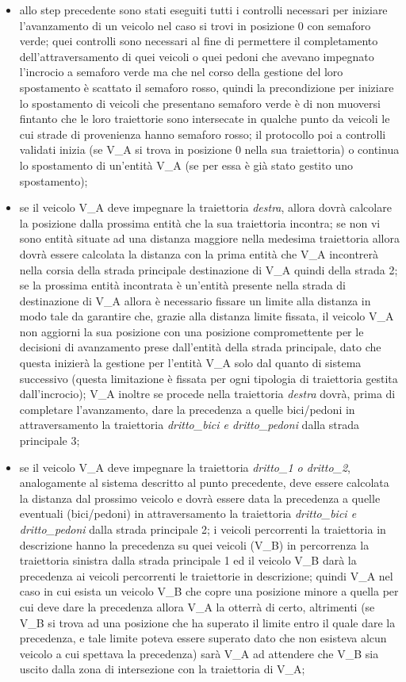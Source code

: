 \begin{enumerate}
\begin{enumerate}
\begin{itemize}
\item allo step precedente sono stati eseguiti tutti i controlli necessari per iniziare l'avanzamento di un veicolo nel caso si trovi in posizione 0 con semaforo verde; quei controlli sono necessari al fine di permettere il completamento dell'attraversamento di quei veicoli o quei pedoni che avevano impegnato l'incrocio a semaforo verde ma che nel corso della gestione del loro spostamento è scattato il semaforo rosso, quindi la precondizione per iniziare lo spostamento di veicoli che presentano semaforo verde è di non muoversi fintanto che le loro traiettorie sono intersecate in qualche punto da veicoli le cui strade di provenienza hanno semaforo rosso; il protocollo poi a controlli validati inizia (se V\_A si trova in posizione 0 nella sua traiettoria) o continua lo spostamento di un'entità V\_A (se per essa è già stato gestito uno spostamento);
\item se il veicolo V\_A deve impegnare la traiettoria \textit{destra}, allora dovrà calcolare la posizione dalla prossima entità che la sua traiettoria incontra; se non vi sono entità situate ad una distanza maggiore nella medesima traiettoria allora dovrà essere calcolata la distanza con la prima entità che V\_A incontrerà nella corsia della strada principale destinazione di V\_A quindi della strada 2; se la prossima entità incontrata è un'entità presente nella strada di destinazione di V\_A allora è necessario fissare un limite alla distanza in modo tale da garantire che, grazie alla distanza limite fissata, il veicolo V\_A non aggiorni la sua posizione con una posizione compromettente per le decisioni di avanzamento prese dall'entità della strada principale, dato che questa inizierà la gestione per l'entità V\_A solo dal quanto di sistema successivo (questa limitazione è fissata per ogni tipologia di traiettoria gestita dall'incrocio); V\_A inoltre se procede nella traiettoria \textit{destra} dovrà, prima di completare l'avanzamento, dare la precedenza a quelle bici/pedoni in attraversamento la traiettoria \textit{drit\-to\_bi\-ci e drit\-to\_pe\-do\-ni} dalla strada principale 3;
\item se il veicolo V\_A deve impegnare la traiettoria \textit{dritto\_1 o dritto\_2}, analogamente al sistema descritto al punto precedente, deve essere calcolata la distanza dal prossimo veicolo e dovrà essere data la precedenza a quelle eventuali (bici/pedoni) in attraversamento la traiettoria \textit{drit\-to\_bi\-ci e drit\-to\_pe\-do\-ni} dalla strada principale 2; i veicoli percorrenti la traiettoria in descrizione hanno la precedenza su quei veicoli (V\_B) in percorrenza la traiettoria sinistra dalla strada principale 1 ed il veicolo V\_B darà la precedenza ai veicoli percorrenti le traiettorie in descrizione; quindi V\_A nel caso in cui esista un veicolo V\_B che copre una posizione minore a quella per cui deve dare la precedenza allora V\_A la otterrà di certo, altrimenti (se V\_B si trova ad una posizione che ha superato il limite entro il quale dare la precedenza, e tale limite poteva essere superato dato che non esisteva alcun veicolo a cui spettava la precedenza) sarà V\_A ad attendere che V\_B sia uscito dalla zona di intersezione con la traiettoria di V\_A;

\end{itemize}
\end{enumerate}
\end{enumerate}

